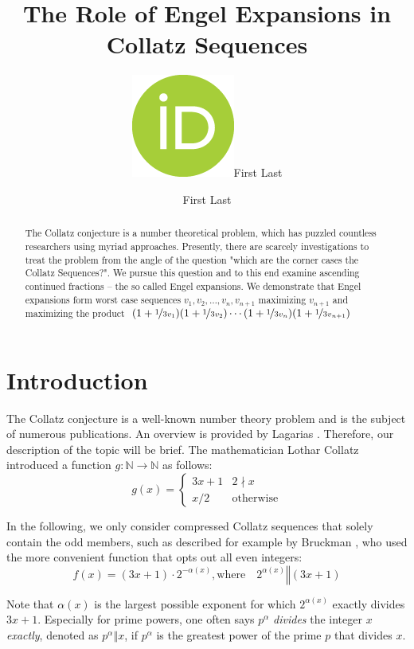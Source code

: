 \documentclass[12pt]{amsart}
\title[Engel Expansions in Collatz Sequences]{The Role of Engel Expansions in Collatz Sequences}
\author[F.\ Last1]{\href{https://orcid.org/0000-0000-0000-0000}{\includegraphics[scale=0.06]{orcid.png}}\hspace{1mm}First Last}
\author[F.\ Last2]{First Last}
\theoremstyle{definition}
\begin{document}
	
\begingroup
\let\MakeUppercase\relax
\maketitle
\endgroup

\begin{abstract}
The Collatz conjecture is a number theoretical problem, which has puzzled countless researchers using myriad approaches. Presently, there are scarcely investigations to treat the problem from the angle of the question "which are the corner cases the Collatz Sequences?". We pursue this question and to this end examine ascending continued fractions -- the so called Engel expansions. We demonstrate that Engel expansions form worst case sequences $v_1,v_2,\ldots,v_n,v_{n+1}$ maximizing $v_{n+1}$ and maximizing the product $(1+\nicefrac{1}{3v_1})(1+\nicefrac{1}{3v_2})\cdots(1+\nicefrac{1}{3v_n})(1+\nicefrac{1}{3v_{n+1}})$
\end{abstract}

\section{Introduction}
\label{introduction}

The Collatz conjecture is a well-known number theory problem and is the subject of numerous publications. An overview is provided by Lagarias \cite{Ref_Lagarias_2010}. Therefore, our description of the topic will be brief. The mathematician Lothar Collatz introduced a function $g:\mathbb{N}\rightarrow\mathbb{N}$ as follows:
\begin{equation}
\label{eq:func_collatz}
g(x)=
\begin{cases}
3x+1	&	2\nmid x\\
x/2		&	\text{otherwise}
\end{cases}
\end{equation}

In the following, we only consider compressed Collatz sequences that solely contain the odd members, such as described for example by Bruckman \cite{Ref_Bruckman_2008}, who used the more convenient function that opts out all even integers:
\begin{equation}
\label{eq:func_collatz_odd}
f(x)=(3x+1)\cdot2^{-\alpha(x)},\text{where}\hspace{1em}2^{\alpha(x)}\mathrel\Vert(3x+1)
\end{equation}

Note that $\alpha(x)$ is the largest possible exponent for which $2^{\alpha(x)}$ exactly divides $3x+1$. Especially for prime powers, one often says $p^\alpha$ \textit{divides} the integer $x$ \textit{exactly}, denoted as $p^\alpha\mathrel\Vert x$, if $p^\alpha$ is the greatest power of the prime $p$ that divides $x$.
\end{document}
